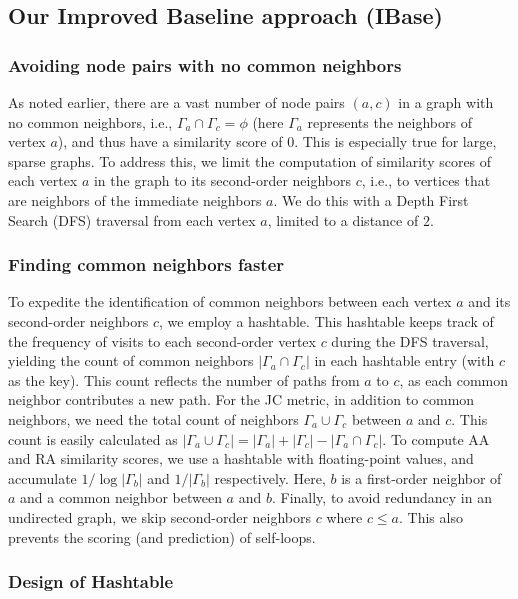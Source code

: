 \subsection{Our Improved Baseline approach (IBase)}

\subsubsection{Avoiding node pairs with no common neighbors}

As noted earlier, there are a vast number of node pairs $(a, c)$ in a graph with no common neighbors, i.e., $\Gamma_a \cap \Gamma_c = \phi$ (here $\Gamma_a$ represents the neighbors of vertex $a$), and thus have a similarity score of $0$. This is especially true for large, sparse graphs. To address this, we limit the computation of similarity scores of each vertex $a$ in the graph to its second-order neighbors $c$, i.e., to vertices that are neighbors of the immediate neighbors $a$. We do this with a Depth First Search (DFS) traversal from each vertex $a$, limited to a distance of $2$.


\subsubsection{Finding common neighbors faster}

To expedite the identification of common neighbors between each vertex $a$ and its second-order neighbors $c$, we employ a hashtable. This hashtable keeps track of the frequency of visits to each second-order vertex $c$ during the DFS traversal, yielding the count of common neighbors $|\Gamma_a \cap \Gamma_c|$ in each hashtable entry (with $c$ as the key). This count reflects the number of paths from $a$ to $c$, as each common neighbor contributes a new path. For the JC metric, in addition to common neighbors, we need the total count of neighbors $\Gamma_a \cup \Gamma_c$ between $a$ and $c$. This count is easily calculated as $|\Gamma_a \cup \Gamma_c| = |\Gamma_a| + |\Gamma_c| - |\Gamma_a \cap \Gamma_c|$. To compute AA and RA similarity scores, we use a hashtable with floating-point values, and accumulate $1/\log{|\Gamma_b|}$ and $1/|\Gamma_b|$ respectively. Here, $b$ is a first-order neighbor of $a$ and a common neighbor between $a$ and $b$. Finally, to avoid redundancy in an undirected graph, we skip second-order neighbors $c$ where $c \leq a$. This also prevents the scoring (and prediction) of self-loops.


\subsubsection{Design of Hashtable}

